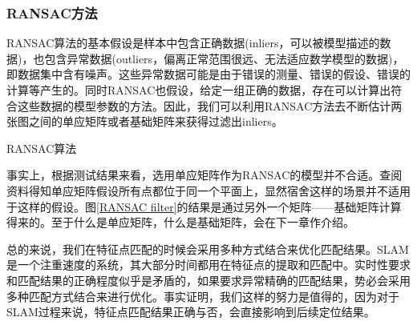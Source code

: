 \subsubsection{RANSAC方法}
\label{section:RANSAC}
RANSAC算法的基本假设是样本中包含正确数据(inliers，可以被模型描述的数据)，也包含异常数据(outliers，偏离正常范围很远、无法适应数学模型的数据)，即数据集中含有噪声。这些异常数据可能是由于错误的测量、错误的假设、错误的计算等产生的。同时RANSAC也假设，给定一组正确的数据，存在可以计算出符合这些数据的模型参数的方法。因此，我们可以利用RANSAC方法去不断估计两张图之间的单应矩阵或者基础矩阵来获得过滤出inliers。
\begin{algorithm}[htb]
	\SetAlgoLined

	\caption{RANSAC算法}
	\label{algo:RANSAC}
\end{algorithm}
\par
事实上，根据测试结果来看，选用单应矩阵作为RANSAC的模型并不合适。查阅资料得知单应矩阵假设所有点都位于同一个平面上，显然宿舍这样的场景并不适用于这样的假设。图\ref{RANSAC filter}的结果是通过另外一个矩阵——基础矩阵计算得来的。至于什么是单应矩阵，什么是基础矩阵，会在下一章作介绍。\par
总的来说，我们在特征点匹配的时候会采用多种方式结合来优化匹配结果。SLAM是一个注重速度的系统，其大部分时间都用在特征点的提取和匹配中。实时性要求和匹配结果的正确程度似乎是矛盾的，如果要求异常精确的匹配结果，势必会采用多种匹配方式结合来进行优化。事实证明，我们这样的努力是值得的，因为对于SLAM过程来说，特征点匹配结果正确与否，会直接影响到后续定位结果。











